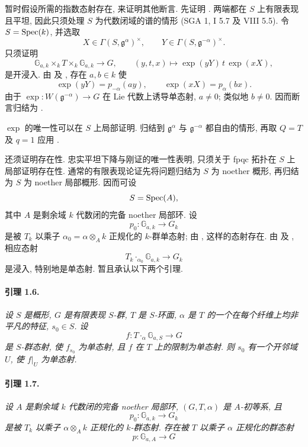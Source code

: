 暂时假设所需的指数态射存在, 来证明其他断言. 先证明 \textup{}. 两端都在 \(S\) 上有限表现且平坦, 因此只须处理 \(S\) 为代数闭域的谱的情形 \textup{(SGA 1, I 5.7 及 VIII 5.5)}. 令 \(S=\operatorname{Spec}(k)\), 并选取
\[
  X\in\Gamma(S,\mathfrak g^\alpha)^\times,
  \qquad
  Y\in\Gamma(S,\mathfrak g^{-\alpha})^\times.
\]
只须证明
\[
  \mathbb G_{a,k}\times_k T\times_k\mathbb G_{a,k}
    \longrightarrow G,
  \qquad
  (y,t,x)\longmapsto \exp(yY)\,t\,\exp(xX),
\]
是开浸入. 由  及 , 存在 \(a,b\in k\) 使
\[
  \exp(yY)=p_{-\alpha}(ay),
  \qquad
  \exp(xX)=p_\alpha(bx).
\]
由于 \(\exp\colon W(\mathfrak g^{-\alpha})\to G\) 在 Lie 代数上诱导单态射, \(a\neq0\); 类似地 \(b\neq0\). 因而断言归结为 .

\(\exp\) 的唯一性可以在 \(S\) 上局部证明. 归结到 \(\mathfrak g^\alpha\) 与 \(\mathfrak g^{-\alpha}\) 都自由的情形, 再取 \(Q=T\) 及 \(q=1\) 应用 .

还须证明存在性. 忠实平坦下降与刚证的唯一性表明, 只须关于 fpqc 拓扑在 \(S\) 上局部证明存在性. 通常的有限表现论证先将问题归结为 \(S\) 为 noether 概形, 再归结为 \(S\) 为 noether 局部概形. 因而可设
\[
  S=\operatorname{Spec}(A),
\]
其中 \(A\) 是剩余域 \(k\) 代数闭的完备 noether 局部环. 设
\[
  p_0\colon\mathbb G_{a,k}\longrightarrow G_k
\]
是被 \(T_k\) 以乘子 \(\alpha_0=\alpha\otimes_A k\) 正规化的 \(k\)-群单态射; 由 , 这样的态射存在. 由  及 , 相应态射
\[
  T_k\mathbin{\cdot_{\alpha_0}}\mathbb G_{a,k}
    \longrightarrow G_k
\]
是浸入, 特别地是单态射. 暂且承认以下两个引理.

\paragraph{\textbf{引理 1.6.}}
\emph{设 \(S\) 是概形, \(G\) 是有限表现 \(S\)-群, \(T\) 是 \(S\)-环面, \(\alpha\) 是 \(T\) 的一个在每个纤维上均非平凡的特征, \(s_0\in S\). 设
\[
  f\colon T\mathbin{\cdot_\alpha}\mathbb G_{a,S}\longrightarrow G
\]
是 \(S\)-群态射, 使 \(f_{s_0}\) 为单态射, 且 \(f\) 在 \(T\) 上的限制为单态射. 则 \(s_0\) 有一个开邻域 \(U\), 使 \(f|_U\) 为单态射.}

\paragraph{\textbf{引理 1.7.}}
\emph{设 \(A\) 是剩余域 \(k\) 代数闭的完备 noether 局部环, \((G,T,\alpha)\) 是 \(A\)-初等系, 且
\[
  p_0\colon\mathbb G_{a,k}\longrightarrow G_k
\]
是被 \(T_k\) 以乘子 \(\alpha\otimes_A k\) 正规化的 \(k\)-群态射. 存在被 \(T\) 以乘子 \(\alpha\) 正规化的群态射
\[
  p\colon\mathbb G_{a,A}\longrightarrow G
\]}

